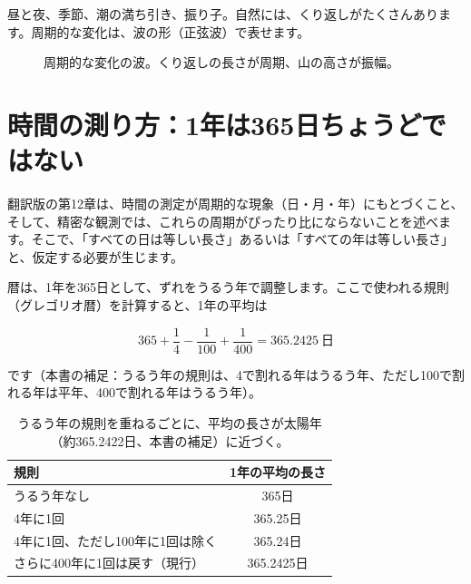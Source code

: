 \documentclass[a4paper,11pt,openany]{ltjsbook}
\begin{document}
昼と夜、季節、潮の満ち引き、振り子。自然には、くり返しがたくさんあります。周期的な変化は、波の形（正弦波）で表せます。

\begin{figure}[htbp]
\centering
{}
\caption{周期的な変化の波。くり返しの長さが周期、山の高さが振幅。}
\end{figure}


\section{時間の測り方：1年は365日ちょうどではない}

翻訳版の第12章は、時間の測定が周期的な現象（日・月・年）にもとづくこと、そして、精密な観測では、これらの周期がぴったり比にならないことを述べます。そこで、「すべての日は等しい長さ」あるいは「すべての年は等しい長さ」と、仮定する必要が生じます。

暦は、1年を365日として、ずれをうるう年で調整します。ここで使われる規則（グレゴリオ暦）を計算すると、1年の平均は

\[
365+\frac14-\frac1{100}+\frac1{400}=365.2425\ \text{日}
\]

です（本書の補足：うるう年の規則は、4で割れる年はうるう年、ただし100で割れる年は平年、400で割れる年はうるう年）。

\begin{table}[htbp]
\centering
\begin{tabular}{lc}
\toprule
規則 & 1年の平均の長さ\\
\midrule
うるう年なし & 365日\\
4年に1回 & 365.25日\\
4年に1回、ただし100年に1回は除く & 365.24日\\
さらに400年に1回は戻す（現行） & 365.2425日\\
\bottomrule
\end{tabular}
\caption{うるう年の規則を重ねるごとに、平均の長さが太陽年（約365.2422日、本書の補足）に近づく。}
\end{table}
\end{document}
